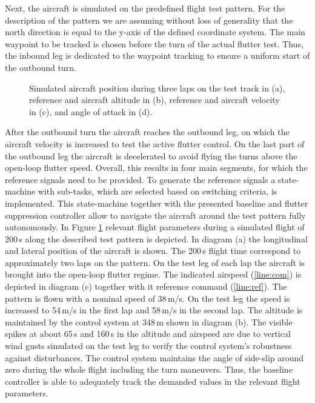 \documentclass[aerospace,article,submit,moreauthors,pdftex,10pt,a4paper]{Definitions/mdpi}
\begin{document}
Next, the aircraft is simulated on the predefined flight test pattern.  For the description of the pattern we are assuming without loss of generality that the north direction is equal to the y-axis of the defined coordinate system. The main waypoint to be tracked is chosen before the turn of the actual flutter test. Thus, the inbound leg is dedicated to the waypoint tracking to ensure a uniform start of the outbound turn. 
\begin{figure}[b!]
	\centering
	
	\caption{Simulated aircraft position during three laps on the test track in (a), reference and aircraft altitude in (b), reference and aircraft velocity in (c), and angle of attack in (d).}
	\label{fig:d1_patt_fp}	
\end{figure}
After the outbound turn the aircraft reaches the outbound leg, on which the aircraft velocity is increased to test the active flutter control.  On the last part of the outbound leg the aircraft is decelerated to avoid flying the turns above the open-loop flutter speed. Overall, this results in four main segments, for which the reference signals need to be provided. To generate the reference signals  a state-machine with sub-tasks, which are selected based on switching criteria, is implemented.
This state-machine together with the presented baseline and flutter suppression controller allow to navigate the aircraft around the test pattern fully autonomously. In Figure \ref{fig:d1_patt_fp} relevant flight parameters during a simulated flight of 200\,s along the described test pattern is depicted. In diagram (a) the longitudinal and lateral position of the aircraft is shown. The 200\,s flight time correspond to approximately two laps on the pattern. On the test leg of each lap the aircraft is brought into the open-loop flutter regime. The  indicated airspeed (\ref{line:com}) is depicted in diagram (c) together with it reference command (\ref{line:ref}). The pattern is flown with a nominal speed of 38\,m/s. On the test leg the speed is increased to 54\,m/s in the first lap and 58\,m/s in the second lap. The altitude is maintained by the control system at 348\,m shown in diagram (b). The visible spikes at about 65\,s and 160\,s in the altitude and airspeed are due to vertical wind gusts simulated on the test leg to verify the control system's robustness  against disturbances. The control system maintains the angle of side-slip around zero during the whole flight including the turn maneuvers. Thus, the baseline controller is able to adequately track the demanded values in the relevant flight parameters.
\end{document}
